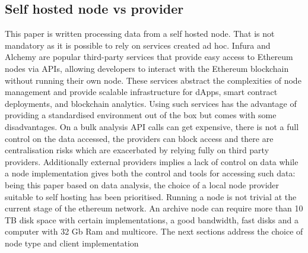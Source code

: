 \documentclass[11pt,a4paper,titlepage]{scrartcl}
\begin{document}
\subsection {Self hosted node vs provider}
This paper is written processing data from a self hosted node. That is not mandatory as it is possible to rely on services created ad hoc. Infura and Alchemy are popular third-party services that provide easy access to Ethereum nodes via APIs, allowing developers to interact with the Ethereum blockchain without running their own node. These services abstract the complexities of node management and provide scalable infrastructure for dApps, smart contract deployments, and blockchain analytics.
Using such services has the advantage of providing a standardised environment out of the box but comes with some disadvantages. On a bulk analysis API calls can get expensive, there is not a full control on the data accessed, the providers can block access and there are centralisation risks which are exacerbated by relying fully on third party providers.
Additionally external providers implies  a lack of control on data while a node implementation gives both the control and tools for accessing such data: being this paper based on data analysis, the choice of a local node provider suitable to self hosting has been prioritised.
Running a node is not  trivial at the current stage of the ethereum network. An archive node can require more than 10 TB disk space with certain implementations, a good bandwidth, fast disks and a computer with 32 Gb Ram and multicore.
The next sections address the choice of node type and client implementation

\begin{table}[ht]
\centering
\caption{Main characteristic Alchemy and Infura}
\label{tab:alchemy_vs_infura}
\end{table}
\end{document}
